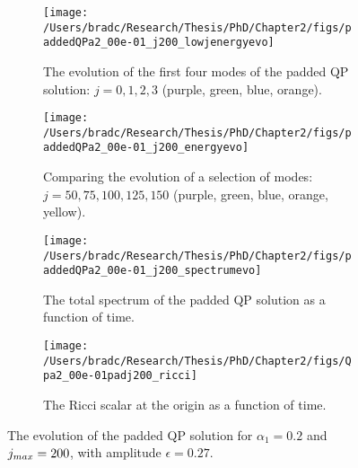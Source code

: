 \documentclass[../PhD.tex]{subfiles}
\begin{document}
\begin{figure}[ht]
	\centering
	\begin{subfigure}[t]{0.45\textwidth}
		\texttt{[image: /Users/bradc/Research/Thesis/PhD/Chapter2/figs/paddedQPa2\_00e-01\_j200\_lowjenergyevo]}
		\caption{The evolution of the first four modes of the padded QP solution: {$j=0,1,2,3$} (purple, green, blue, orange).}
	\end{subfigure}
	\;
	\begin{subfigure}[t]{0.45\textwidth}
		\texttt{[image: /Users/bradc/Research/Thesis/PhD/Chapter2/figs/paddedQPa2\_00e-01\_j200\_energyevo]}
		\caption{Comparing the evolution of a selection of modes: {$j= 50, 75, 100, 125, 150$} (purple, green, blue, orange, yellow).}
	\end{subfigure}
	\;
	\begin{subfigure}[t]{0.45\textwidth}
		\texttt{[image: /Users/bradc/Research/Thesis/PhD/Chapter2/figs/paddedQPa2\_00e-01\_j200\_spectrumevo]}
		\caption{The total spectrum of the padded QP solution as a function of time.}
		\label{fig: paddedqp_fullspecevo}
	\end{subfigure}
	\;
	\begin{subfigure}[t]{0.45\textwidth}
		\texttt{[image: /Users/bradc/Research/Thesis/PhD/Chapter2/figs/Qpa2\_00e-01padj200\_ricci]}
		\caption{The Ricci scalar at the origin as a function of time.}
		\label{fig: Qpa2_00e-01padj200_ricci}
	\end{subfigure}
	\caption[The evolution of a padded QP solution]{The evolution of the padded QP solution for $\alpha_1 =0.2$ and $j_{max} = 200$, with amplitude $\epsilon=0.27$.}
	\label{fig:paddedqpevo}
\end{figure}

\end{document}
